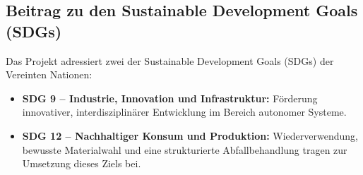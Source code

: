 \documentclass[main.tex]{subfiles} %
\begin{document}

\subsection{Beitrag zu den Sustainable Development Goals (SDGs)}

Das Projekt adressiert zwei der Sustainable Development Goals (SDGs) der Vereinten 
Nationen:

\begin{itemize}
    \item \textbf{SDG 9 – Industrie, Innovation und Infrastruktur:} 
    Förderung innovativer, interdisziplinärer Entwicklung im Bereich 
    autonomer Systeme.

    \item \textbf{SDG 12 – Nachhaltiger Konsum und Produktion:} 
    Wiederverwendung, bewusste Materialwahl und eine strukturierte Abfallbehandlung 
    tragen zur Umsetzung dieses Ziels bei.
\end{itemize}
\end{document}
